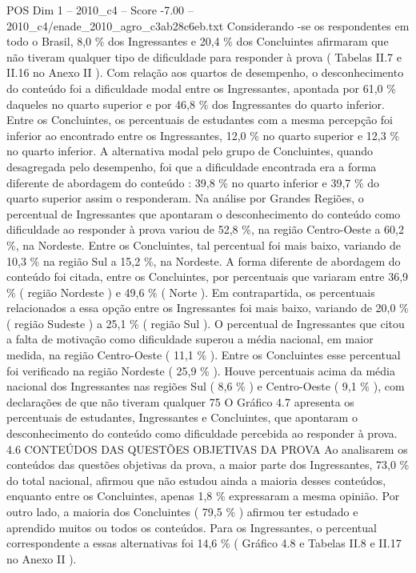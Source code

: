 \begin{textsample}{POS Dim 1 – 2010\_c4 – Score -7.00 – 2010\_c4/enade\_2010\_agro\_c3ab28c6eb.txt}
Considerando -se os respondentes em todo o Brasil, 8,0 \% dos Ingressantes e 20,4 \% dos Concluintes afirmaram que não tiveram qualquer tipo de dificuldade para responder à prova ( Tabelas II.7 e II.16 no Anexo II ).
Com relação aos quartos de desempenho, o desconhecimento do conteúdo foi a dificuldade modal entre os Ingressantes, apontada por 61,0 \% daqueles no quarto superior e por 46,8 \% dos Ingressantes do quarto inferior.
Entre os Concluintes, os percentuais de estudantes com a mesma percepção foi inferior ao encontrado entre os Ingressantes, 12,0 \% no quarto superior e 12,3 \% no quarto inferior.
A alternativa modal pelo grupo de Concluintes, quando desagregada pelo desempenho, foi que a dificuldade encontrada era a forma diferente de abordagem do conteúdo : 39,8 \% no quarto inferior e 39,7 \% do quarto superior assim o responderam.
Na análise por Grandes Regiões, o percentual de Ingressantes que apontaram o desconhecimento do conteúdo como dificuldade ao responder à prova variou de 52,8 \%, na região Centro-Oeste a 60,2 \%, na Nordeste.
Entre os Concluintes, tal percentual foi mais baixo, variando de 10,3 \% na região Sul a 15,2 \%, na Nordeste.
A forma diferente de abordagem do conteúdo foi citada, entre os Concluintes, por percentuais que variaram entre 36,9 \% ( região Nordeste ) e 49,6 \% ( Norte ).
Em contrapartida, os percentuais relacionados a essa opção entre os Ingressantes foi mais baixo, variando de 20,0 \% ( região Sudeste ) a 25,1 \% ( região Sul ).
O percentual de Ingressantes que citou a falta de motivação como dificuldade superou a média nacional, em maior medida, na região Centro-Oeste ( 11,1 \% ).
Entre os Concluintes esse percentual foi verificado na região Nordeste ( 25,9 \% ).
Houve percentuais acima da média nacional dos Ingressantes nas regiões Sul ( 8,6 \% ) e Centro-Oeste ( 9,1 \% ), com declarações de que não tiveram qualquer 75 O Gráfico 4.7 apresenta os percentuais de estudantes, Ingressantes e Concluintes, que apontaram o desconhecimento do conteúdo como dificuldade percebida ao responder à prova. 4.6 CONTEÚDOS DAS QUESTÕES OBJETIVAS DA PROVA Ao analisarem os conteúdos das questões objetivas da prova, a maior parte dos Ingressantes, 73,0 \% do total nacional, afirmou que não estudou ainda a maioria desses conteúdos, enquanto entre os Concluintes, apenas 1,8 \% expressaram a mesma opinião.
Por outro lado, a maioria dos Concluintes ( 79,5 \% ) afirmou ter estudado e aprendido muitos ou todos os conteúdos.
Para os Ingressantes, o percentual correspondente a essas alternativas foi 14,6 \% ( Gráfico 4.8 e Tabelas II.8 e II.17 no Anexo II ).

\end{textsample}
